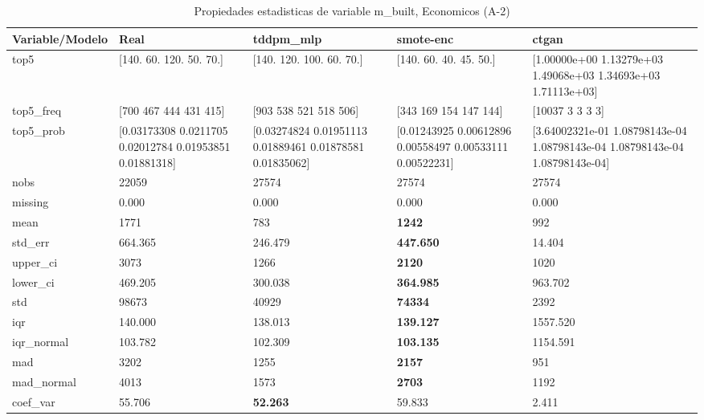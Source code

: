 \begin{table}[H]
\centering
\fontsize{8}{14}\selectfont
\caption{Propiedades  estadisticas de variable m\_built, Economicos (A-2)}
\label{table-stats-economicos-a-2-m_built}
\begin{tabular}{|l|m{10em}|m{10em}|m{10em}|m{10em}|}
\hline
 \rowcolor[gray]{0.8}
Variable/Modelo & Real & tddpm\_mlp & smote-enc & ctgan \\
\hline top5 & [140.  60. 120.  50.  70.] & [140. 120. 100.  60.  70.] & [140.  60.  40.  45.  50.] & [1.00000e+00 1.13279e+03 1.49068e+03 1.34693e+03 1.71113e+03] \\
\hline top5\_freq & [700 467 444 431 415] & [903 538 521 518 506] & [343 169 154 147 144] & [10037     3     3     3     3] \\
\hline top5\_prob & [0.03173308 0.0211705  0.02012784 0.01953851 0.01881318] & [0.03274824 0.01951113 0.01889461 0.01878581 0.01835062] & [0.01243925 0.00612896 0.00558497 0.00533111 0.00522231] & [3.64002321e-01 1.08798143e-04 1.08798143e-04 1.08798143e-04
 1.08798143e-04] \\
\hline nobs & 22059 & 27574 & 27574 & 27574 \\
\hline missing & 0.000 & 0.000 & 0.000 & 0.000 \\
\hline mean & 1771 & \cellcolor[rgb]{0.9, 0.54, 0.52} 783 & \bfseries 1242 & 992 \\
\hline std\_err & 664.365 & 246.479 & \bfseries 447.650 & \cellcolor[rgb]{0.9, 0.54, 0.52} 14.404 \\
\hline upper\_ci & 3073 & 1266 & \bfseries 2120 & \cellcolor[rgb]{0.9, 0.54, 0.52} 1020 \\
\hline lower\_ci & 469.205 & 300.038 & \bfseries 364.985 & \cellcolor[rgb]{0.9, 0.54, 0.52} 963.702 \\
\hline std & 98673 & 40929 & \bfseries 74334 & \cellcolor[rgb]{0.9, 0.54, 0.52} 2392 \\
\hline iqr & 140.000 & 138.013 & \bfseries 139.127 & \cellcolor[rgb]{0.9, 0.54, 0.52} 1557.520 \\
\hline iqr\_normal & 103.782 & 102.309 & \bfseries 103.135 & \cellcolor[rgb]{0.9, 0.54, 0.52} 1154.591 \\
\hline mad & 3202 & 1255 & \bfseries 2157 & \cellcolor[rgb]{0.9, 0.54, 0.52} 951 \\
\hline mad\_normal & 4013 & 1573 & \bfseries 2703 & \cellcolor[rgb]{0.9, 0.54, 0.52} 1192 \\
\hline coef\_var & 55.706 & \bfseries 52.263 & 59.833 & \cellcolor[rgb]{0.9, 0.54, 0.52} 2.411 \\

\end{tabular}
\end{table}
